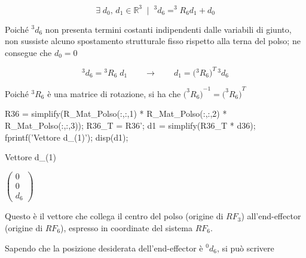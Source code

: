 \documentclass[11pt, a4paper]{article}
\begin{document}
\[
    \exists \;d_0 ,\,d_1 \in {\mathbb{R}}^3 \;\mid \;^3 d_6 =^3 R_6 d_1 +d_0
\]

\begin{par}
\begin{flushleft}
Poiché $^3 d_6$ non presenta termini costanti indipendenti dalle variabili di giunto, non sussiste alcuno spostamento strutturale fisso rispetto alla terna del polso; ne consegue che $d_0 =0$
\end{flushleft}
\end{par}

\[
    ^3 d_6 = {}^{3}R_{6} \; d_{1} \qquad \longrightarrow \qquad d_{1} = \bigl({}^{3}R_{6}\bigr)^{T} \, ^3 d_6
\]

\begin{par}
\begin{flushleft}
Poiché $^3 R_6$ è una matrice di rotazione, si ha che ${\bigl(^3 R_6 \bigr)}^{-1} ={\bigl(^3 R_6 \bigr)}^T$
\end{flushleft}
\end{par}

\begin{matlabcode}
R36 = simplify(R_Mat_Polso(:,:,1) * R_Mat_Polso(:,:,2) * R_Mat_Polso(:,:,3));
R36_T = R36';
d1 = simplify(R36_T * d36);
fprintf('Vettore d_(1)');
disp(d1);
\end{matlabcode}
\begin{matlaboutput}
Vettore d_(1)
\end{matlaboutput}
\begin{matlabsymbolicoutput}
$
    \begin{pmatrix}
        0\\
        0\\
        d_{6}
    \end{pmatrix}
$
\end{matlabsymbolicoutput}
\newpage
\begin{par}
\begin{flushleft}
Questo è il vettore che collega il centro del polso (origine di $RF_3$) all'end-effector (origine di $RF_6$), espresso in coordinate del sistema $RF_6$.
\end{flushleft}
\end{par}

\begin{par}
\begin{flushleft}
Sapendo che la posizione desiderata dell'end-effector è $^0 d_6$, si può scrivere
\end{flushleft}
\end{par}
\end{document}
